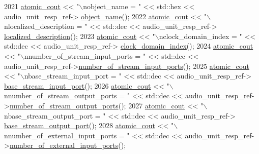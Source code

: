 \begin{DoxyCode}
2021             \hyperlink{cmd__line_8h_a0bc38ccc65c79ba06c6fcd7b4bf554c3}{atomic\_cout} << \textcolor{stringliteral}{"\(\backslash\)nobject\_name = "} << std::hex << audio\_unit\_resp\_ref->
      \hyperlink{classavdecc__lib_1_1descriptor__response__base_a133f7774946d80f82b8aaaa4cfbb7361}{object\_name}();
2022             \hyperlink{cmd__line_8h_a0bc38ccc65c79ba06c6fcd7b4bf554c3}{atomic\_cout} << \textcolor{stringliteral}{"\(\backslash\)nlocalized\_description = "} << std::dec << audio\_unit\_resp\_ref->
      \hyperlink{classavdecc__lib_1_1audio__unit__descriptor__response_a1fb9de45567df344090a1407aa6b775f}{localized\_description}();
2023             \hyperlink{cmd__line_8h_a0bc38ccc65c79ba06c6fcd7b4bf554c3}{atomic\_cout} << \textcolor{stringliteral}{"\(\backslash\)nclock\_domain\_index = "} << std::dec << audio\_unit\_resp\_ref->
      \hyperlink{classavdecc__lib_1_1audio__unit__descriptor__response_aab7f93d403d8b73f8f4a8fb7c61ecded}{clock\_domain\_index}();
2024             \hyperlink{cmd__line_8h_a0bc38ccc65c79ba06c6fcd7b4bf554c3}{atomic\_cout} << \textcolor{stringliteral}{"\(\backslash\)nnumber\_of\_stream\_input\_ports = "} << std::dec << 
      audio\_unit\_resp\_ref->\hyperlink{classavdecc__lib_1_1audio__unit__descriptor__response_aa99346300c900eeffea74a9a97beefef}{number\_of\_stream\_input\_ports}();
2025             \hyperlink{cmd__line_8h_a0bc38ccc65c79ba06c6fcd7b4bf554c3}{atomic\_cout} << \textcolor{stringliteral}{"\(\backslash\)nbase\_stream\_input\_port = "} << std::dec << audio\_unit\_resp\_ref->
      \hyperlink{classavdecc__lib_1_1audio__unit__descriptor__response_ae4188101b1f0ecc73df7762e9255c074}{base\_stream\_input\_port}();
2026             \hyperlink{cmd__line_8h_a0bc38ccc65c79ba06c6fcd7b4bf554c3}{atomic\_cout} << \textcolor{stringliteral}{"\(\backslash\)nnumber\_of\_stream\_output\_ports = "} << std::dec << 
      audio\_unit\_resp\_ref->\hyperlink{classavdecc__lib_1_1audio__unit__descriptor__response_a14e1ea13bc7442fb1e4f3443babacf84}{number\_of\_stream\_output\_ports}();
2027             \hyperlink{cmd__line_8h_a0bc38ccc65c79ba06c6fcd7b4bf554c3}{atomic\_cout} << \textcolor{stringliteral}{"\(\backslash\)nbase\_stream\_output\_port = "} << std::dec << audio\_unit\_resp\_ref->
      \hyperlink{classavdecc__lib_1_1audio__unit__descriptor__response_a868aa2764440282347aea09c5a09cbb8}{base\_stream\_output\_port}();
2028             \hyperlink{cmd__line_8h_a0bc38ccc65c79ba06c6fcd7b4bf554c3}{atomic\_cout} << \textcolor{stringliteral}{"\(\backslash\)nnumber\_of\_external\_input\_ports = "} << std::dec << 
      audio\_unit\_resp\_ref->\hyperlink{classavdecc__lib_1_1audio__unit__descriptor__response_a6f110a2b5251cae78053f519e9b03084}{number\_of\_external\_input\_ports}();

\end{DoxyCode}
